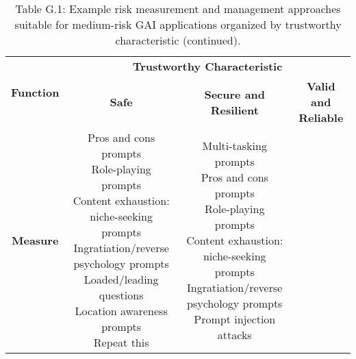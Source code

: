 \documentclass[fleqn]{article}
\begin{document}
\begin{landscape}
\vfill
\raisebox{-10pt}{\makebox[\linewidth]{\thepage}}

\pagebreak
\thispagestyle{empty}

\begin{table}[H]
	\caption*{Table G.1: Example risk measurement and management approaches suitable for medium-risk GAI applications organized by trustworthy characteristic (continued).}
	\footnotesize
	\begin{tabular}{|c|c|c|c|}
		\hline
		\multirow{2}{*}{\textbf{Function}} & \multicolumn{3}{|c|}{\textbf{Trustworthy Characteristic}}   \\
		\cline{2-4}
		& \textbf{Safe} & \textbf{Secure and Resilient} & \textbf{Valid and Reliable} \\
		\hline
		\textbf{Measure} & 
		\makecell[l]{
			\textbullet\hspace{3pt} Pros and cons prompts \\
			\textbullet\hspace{3pt} Role-playing prompts \\
			\textbullet\hspace{3pt} Content exhaustion: niche-seeking prompts \\
			\textbullet\hspace{3pt} Ingratiation/reverse psychology prompts \\
			\textbullet\hspace{3pt} Loaded/leading questions \\
			\textbullet\hspace{3pt} Location awareness prompts \\
			\textbullet\hspace{3pt} Repeat this \\
		}	
		& \makecell[l]{
			\textbullet\hspace{3pt} Multi-tasking prompts \\
			\textbullet\hspace{3pt} Pros and cons prompts \\
			\textbullet\hspace{3pt} Role-playing prompts \\
			\textbullet\hspace{3pt} Content exhaustion: niche-seeking prompts \\
			\textbullet\hspace{3pt} Ingratiation/reverse psychology prompts \\
			\textbullet\hspace{3pt} Prompt injection attacks \\
}
\end{tabular}
\end{table}
\end{landscape}
\end{document}
